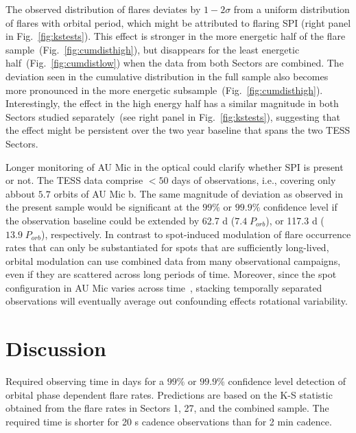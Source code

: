 \documentclass[fleqn,usenatbib,letters]{mnras}%
\begin{document}
The observed distribution of flares deviates by $1-2\sigma$ from a uniform distribution of flares with orbital period, which might be attributed to flaring SPI (right panel in Fig.~\ref{fig:kstests}). This effect is stronger in the more energetic half of the flare sample~(Fig.~\ref{fig:cumdisthigh}), but disappears for the least energetic half~(Fig.~\ref{fig:cumdistlow}) when the data from both Sectors are combined. The deviation seen in the cumulative distribution in the full sample also becomes more pronounced in the more energetic subsample~(Fig.~\ref{fig:cumdisthigh}). Interestingly, the effect in the high energy half has a similar magnitude in both Sectors studied separately~(see right panel in Fig.~\ref{fig:kstests}), suggesting that the effect might be persistent over the two year baseline that spans the two TESS Sectors.

Longer monitoring of AU Mic in the optical could clarify whether SPI is present or not. The TESS data comprise $<50$ days of observations, i.e., covering only abbout $5.7$ orbits of AU Mic b. The same magnitude of deviation as observed in the present sample would be significant at the $99\%$ or $99.9\%$ confidence level if the observation baseline could be extended by 62.7 d ($7.4\;P_{orb}$), or 117.3 d ($13.9\;P_{orb}$), respectively.  In contrast to spot-induced modulation of flare occurrence rates that can only be substantiated for spots that are sufficiently long-lived, orbital modulation can use combined data from many observational campaigns, even if they are scattered across long periods of time. Moreover, since the spot configuration in AU Mic varies across time~\citep{martioli2021}, stacking temporally separated observations will eventually average out confounding effects rotational variability. 
\section{Discussion}
\label{sec:discussion}

\begin{table}
\caption{Required observing time in days for a $99\%$ or $99.9\%$ confidence level detection of orbital phase dependent flare rates. Predictions are based on the K-S statistic obtained from the flare rates in Sectors 1, 27, and the combined sample. The required time is shorter for 20 s cadence observations than for 2 min cadence.}
\centering

\label{tab:prediction}
\end{table}
\end{document}
